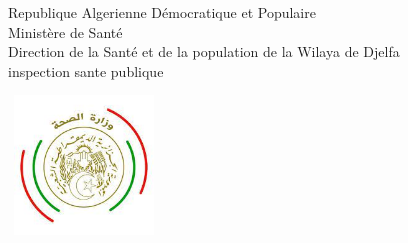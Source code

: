 

\begin{centering}

  \begin{center}
    \normalsize{Republique Algerienne Démocratique et Populaire}\\
    \normalsize{Ministère de Santé}\\
    \normalsize{Direction de la Santé et de la population de la Wilaya de Djelfa}\\
    \normalsize{inspection sante publique}\\
  \end{center}
  \begin{center}
    \includegraphics[width=4cm,height=3.7cm]{img/msp.jpg}
  \end{center}

\end{centering}
